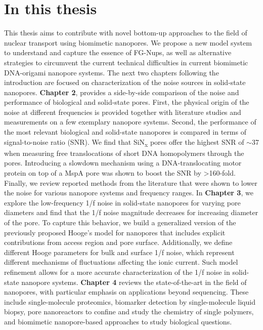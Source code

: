 \section[In this thesis]{In this thesis%
}
This thesis aims to contribute with novel bottom-up approaches to the field of nuclear transport using biomimetic nanopores. We propose a new model system to understand and capture the essence of FG-Nups, as well as alternative strategies to circumvent the current technical difficulties in current biomimetic DNA-origami nanopore systems. The next two chapters following the introduction are focused on characterization of the noise sources in solid-state nanopores. \textbf{Chapter 2}, provides a side-by-side comparison of the noise and performance of biological and solid-state pores. First, the physical origin of the noise at different frequencies is provided together with literature studies and measurements on a few exemplary nanopore systems. Second, the performance of the most relevant biological and solid-state nanopores is compared in terms of signal-to-noise ratio (SNR). We find that SiN\textsubscript{x} pores offer the highest SNR of $\sim$37 when measuring free translocations of short DNA homopolymers through the pores. Introducing a slowdown mechanism using a DNA-translocating motor protein on top of a MspA pore was shown to boost the SNR by >160-fold. Finally, we review reported methods from the literature that were shown to lower the noise for various nanopore systems and frequency ranges. In \textbf{Chapter 3}, we explore the low-frequency 1/f noise in solid-state nanopores for varying pore diameters and find that the 1/f noise magnitude decreases for increasing diameter of the pore. To capture this behavior, we build a generalized version of the previously proposed Hooge’s model for nanopores that includes explicit contributions from access region and pore surface. Additionally, we define different Hooge parameters for bulk and surface 1/f noise, which represent different mechanisms of fluctuations affecting the ionic current. Such model refinement allows for a more accurate characterization of the 1/f noise in solid-state nanopore systems.  \textbf{Chapter 4} reviews the state-of-the-art in the field of nanopores, with particular emphasis on applications beyond sequencing. These include single-molecule proteomics, biomarker detection by single-molecule liquid biopsy, pore nanoreactors to confine and study the chemistry of single polymers, and biomimetic nanopore-based approaches to study biological questions. 
\\[0.5pt]

